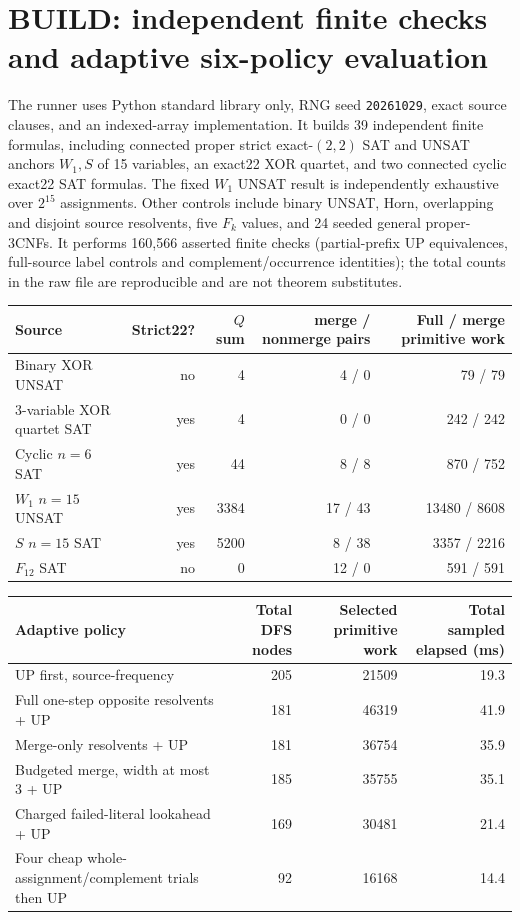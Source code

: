 \documentclass[10pt]{article}
\begin{document}
\section{BUILD: independent finite checks and adaptive six-policy evaluation}
The runner uses Python standard library only, RNG seed \texttt{20261029}, exact source clauses, and an indexed-array implementation. It builds 39 independent finite formulas, including connected proper strict exact-$(2,2)$ SAT and UNSAT anchors $W_1,S$ of 15 variables, an exact22 XOR quartet, and two connected cyclic exact22 SAT formulas. The fixed $W_1$ UNSAT result is independently exhaustive over $2^{15}$ assignments. Other controls include binary UNSAT, Horn, overlapping and disjoint source resolvents, five $F_k$ values, and 24 seeded general proper-3CNFs. It performs 160,566 asserted finite checks (partial-prefix UP equivalences, full-source label controls and complement/occurrence identities); the total counts in the raw file are reproducible and are not theorem substitutes.

\begin{center}\small
\begin{tabular}{lrrrr}
\toprule
Source & Strict22? & $Q$ sum & merge / nonmerge pairs & Full / merge primitive work\\
\midrule
Binary XOR UNSAT & no &4 &4 / 0 &79 / 79\\
3-variable XOR quartet SAT & yes &4 &0 / 0 &242 / 242\\
Cyclic $n=6$ SAT & yes &44 &8 / 8 &870 / 752\\
$W_1$ $n=15$ UNSAT & yes &3384 &17 / 43 &13480 / 8608\\
$S$ $n=15$ SAT & yes &5200 &8 / 38 &3357 / 2216\\
$F_{12}$ SAT & no &0 &12 / 0 &591 / 591\\
\bottomrule
\end{tabular}
\end{center}

\begin{center}\small
\begin{tabular}{lrrr}
\toprule
Adaptive policy & Total DFS nodes & Selected primitive work & Total sampled elapsed (ms)\\
\midrule
UP first, source-frequency &205&21509&19.3\\
Full one-step opposite resolvents + UP &181&46319&41.9\\
Merge-only resolvents + UP &181&36754&35.9\\
Budgeted merge, width at most 3 + UP &185&35755&35.1\\
Charged failed-literal lookahead + UP &169&30481&21.4\\
Four cheap whole-assignment/complement trials then UP &92&16168&14.4\\
\bottomrule
\end{tabular}
\end{center}
\end{document}
